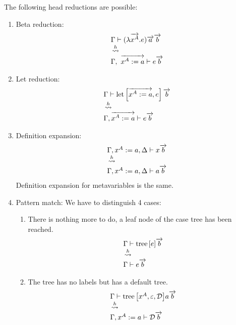 The following head reductions are possible:
\begin{enumerate}
    \item Beta reduction:
        $$
        \vertlist{
            \Gamma \vdash (\lambda \vec{ x^A}. e) \vec a \vec b
            \\
            \hreduce
            \\
            \Gamma, \vec{x^A := a} \vdash e \vec b
        }
        $$



    \item Let reduction:
        $$
        \begin{array}{lllll} 
            \Gamma \vdash {\text{let}}\left[ {{\overrightarrow {x^A := a}}, e} \right] {\overrightarrow {b}}
            \\
            \,\stackrel{h}{\leadsto}\,
            \\
            \Gamma, {\overrightarrow {x^A:=a}} \vdash e {\overrightarrow {b}}
         \end{array}
        $$



    \item Definition expansion:
        $$
        \begin{array}{lllll} 
            \Gamma, x^A:=a, \Delta \vdash x {\overrightarrow {b}}
            \\
            \,\stackrel{h}{\leadsto}\,
            \\
            \Gamma, x^A:=a, \Delta \vdash a {\overrightarrow {b}}
         \end{array}
        $$
        Definition expansion for metavariables is the same.



    \item Pattern match:
        We have to distinguish 4 cases:
        \begin{enumerate}
            \item There is nothing more to do, a leaf node of the case tree has
                been reached.
                $$
                \begin{array}{lllll} 
                    \Gamma \vdash {{\text{tree}}\left[ {e} \right]} {\overrightarrow {b}}
                    \\
                    \,\stackrel{h}{\leadsto}\,
                    \\
                    \Gamma \vdash e {\overrightarrow {b}}
                 \end{array}
                $$

            \item The tree has no labels but has a default tree.
                $$
                \begin{array}{lllll} 
                    \Gamma \vdash {{\text{tree}}\left[ {x^A, \varepsilon, {\mathcal D}} \right]} a {\overrightarrow {b}}
                    \\
                    \,\stackrel{h}{\leadsto}\,
                    \\
                    \Gamma,x^A := a \vdash {\mathcal D} {\overrightarrow {b}}
                 \end{array}
                $$


\end{enumerate}
\end{enumerate}
